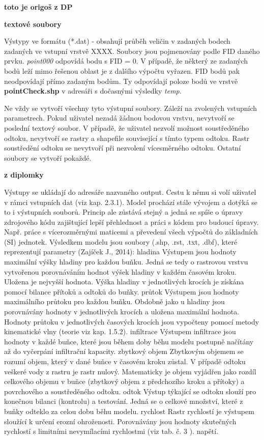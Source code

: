 \textbf{toto je origoš z DP}

\textbf{textové soubory}

Výstypy ve formátu (*.dat) - obsahují průběh veličin v zadaných bodech zadaných ve vstupní vrstvě XXXX. Soubory jsou pojmenovány podle FID daného prvku. \textit{point000} odpovídá bodu s FID = 0. V případě, že některý ze zadaných bodů leží mimo řešenou oblast je z dalšího výpočtu vyřazen. FID bodů pak neodpovídají přímo zadaným bodům. Ty odpovídají poloze bodů ve vrstvě \textbf{pointCheck.shp} v adresáři s dočasnými výsledky \textit{temp}.

\par Ne vždy se vytvoří všechny tyto výstupní soubory. Záleží na zvolených vstupních parametrech. Pokud uživatel nezadá žádnou bodovou vrstvu, nevytvoří se poslední textový soubor. 
V případě, že uživatel nezvolí možnost soustředěného odtoku, nevytvoří se rastry a shapefile související s tímto typem odtoku. Rastr soustředění odtoku se nevytvoří při nezvolení vícesměrného odtoku. 
Ostatní soubory se vytvoří pokaždé.  

\textbf{ z diplomky}

Výstupy se ukládají do adresáře nazvaného output. Cestu k němu si volí uživatel v rámci vstupních dat (viz kap. 2.3.1). Model prochází stále vývojem a dotýká se to i výstupních souborů. Princip ale zůstává stejný a jedná se spíše o úpravy zdrojového kódu zajištující lepší přehlednost a práci s kódem pro budoucí úpravy. Např. práce s vícerozměrnými maticemi a převedení všech výpočtů do základních (SI) jednotek. 
Výsledkem modelu jsou soubory (.shp, .rst, .txt, .dbf), které reprezentují parametry (Zajíček J., 2014):
hladina
Výstupem jsou hodnoty maximální výšky hladiny pro každou buňku. Jedná se tedy o rastrovou vrstvu vytvořenou porovnáváním hodnot výšek hladiny v každém časovém kroku. Uložena je nejvyšší hodnota. Výška hladiny v jednotlivých krocích je získána pomocí bilance přítoků a odtoků do buňky.  
průtok
Výstupem jsou hodnoty maximálního průtoku pro každou buňku. Obdobně jako u hladiny jsou porovnávány hodnoty v jednotlivých krocích a uložena maximální hodnota. Hodnoty průtoku v jednotlivých časových krocích jsou vypočteny pomocí metody kinematické vlny (teorie viz kap. 1.5.2).
infiltrace
Výstupem infiltrace jsou hodnoty v každé buňce, které jsou během doby běhu modelu postupně načítány až do vyčerpání infiltrační kapacity.
zbytkový objem
Zbytkovým objemem se rozumí objem, který v dané buňce v časovém kroku zůstal. V případě odtoku veškeré vody z rastru je rastr nulový. Matematicky je objem vyjádřen jako rozdíl celkového objemu v buňce (zbytkový objem z předchozího kroku a přítoky) a povrchového a soustředěného odtoku.
odtok
Výstup týkající se odtoku slouží pro konečnou bilanci (kontrolu) a testování. Jedná se o celkové množství, které z buňky odteklo za celou dobu běhu modelu. 
rychlost
Rastr rychlostí je výstupem sloužící k určení erozní ohroženosti. Porovnávány jsou hodnoty skutečných rychlostí s limitními nevymílacími rychlostmi (viz tab. č. 3 ).
napětí. 

